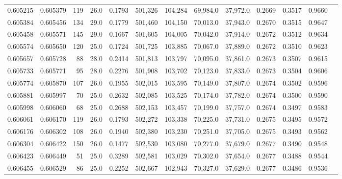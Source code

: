 \begin{tabular}{rrrrrrrrrrrrr}
0.605215 & 0.605379 &   119 & 26.0 &                                     0.1793 & 501,326 & 104,284 &  69,984.0 &  37,972.0 & 0.2669 & 0.3517 & 0.9660 \\
0.605384 & 0.605456 &   134 & 29.0 &                                     0.1779 & 501,460 & 104,150 &  70,013.0 &  37,943.0 & 0.2670 & 0.3515 & 0.9647 \\
0.605458 & 0.605571 &   145 & 29.0 &                                     0.1667 & 501,605 & 104,005 &  70,042.0 &  37,914.0 & 0.2672 & 0.3512 & 0.9634 \\
0.605574 & 0.605650 &   120 & 25.0 &                                     0.1724 & 501,725 & 103,885 &  70,067.0 &  37,889.0 & 0.2672 & 0.3510 & 0.9623 \\
0.605657 & 0.605728 &    88 & 28.0 &                                     0.2414 & 501,813 & 103,797 &  70,095.0 &  37,861.0 & 0.2673 & 0.3507 & 0.9615 \\
0.605733 & 0.605771 &    95 & 28.0 &                                     0.2276 & 501,908 & 103,702 &  70,123.0 &  37,833.0 & 0.2673 & 0.3504 & 0.9606 \\
0.605774 & 0.605870 &   107 & 26.0 &                                     0.1955 & 502,015 & 103,595 &  70,149.0 &  37,807.0 & 0.2674 & 0.3502 & 0.9596 \\
0.605881 & 0.605997 &    70 & 25.0 &                                     0.2632 & 502,085 & 103,525 &  70,174.0 &  37,782.0 & 0.2674 & 0.3500 & 0.9590 \\
0.605998 & 0.606060 &    68 & 25.0 &                                     0.2688 & 502,153 & 103,457 &  70,199.0 &  37,757.0 & 0.2674 & 0.3497 & 0.9583 \\
0.606061 & 0.606170 &   119 & 26.0 &                                     0.1793 & 502,272 & 103,338 &  70,225.0 &  37,731.0 & 0.2675 & 0.3495 & 0.9572 \\
0.606176 & 0.606302 &   108 & 26.0 &                                     0.1940 & 502,380 & 103,230 &  70,251.0 &  37,705.0 & 0.2675 & 0.3493 & 0.9562 \\
0.606304 & 0.606422 &   150 & 26.0 &                                     0.1477 & 502,530 & 103,080 &  70,277.0 &  37,679.0 & 0.2677 & 0.3490 & 0.9548 \\
0.606423 & 0.606449 &    51 & 25.0 &                                     0.3289 & 502,581 & 103,029 &  70,302.0 &  37,654.0 & 0.2677 & 0.3488 & 0.9544 \\
0.606455 & 0.606529 &    86 & 25.0 &                                     0.2252 & 502,667 & 102,943 &  70,327.0 &  37,629.0 & 0.2677 & 0.3486 & 0.9536 \\

\end{tabular}
